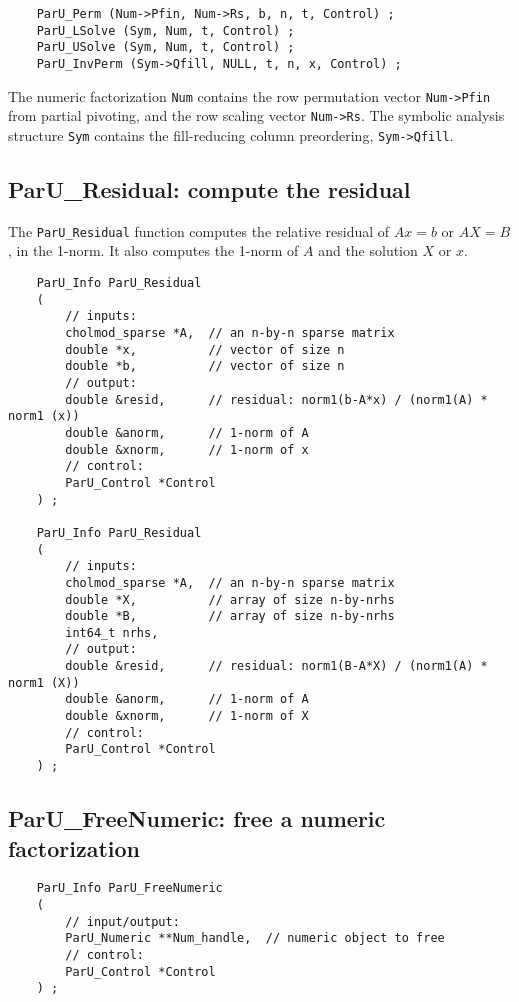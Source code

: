 \documentclass[12pt]{article}
\begin{document}
    {\footnotesize
    \begin{verbatim}
    ParU_Perm (Num->Pfin, Num->Rs, b, n, t, Control) ;
    ParU_LSolve (Sym, Num, t, Control) ;
    ParU_USolve (Sym, Num, t, Control) ;
    ParU_InvPerm (Sym->Qfill, NULL, t, n, x, Control) ; \end{verbatim} }

    The numeric factorization \verb'Num' contains the row permutation vector
    \verb'Num->Pfin' from partial pivoting, and the row scaling vector
    \verb'Num->Rs'.  The symbolic analysis structure \verb'Sym' contains the
    fill-reducing column preordering, \verb'Sym->Qfill'.

\subsection{{\sf ParU\_Residual}: compute the residual}

    The \verb'ParU_Residual' function computes the relative residual of
    $Ax=b$ or $AX=B$, in the 1-norm.  It also computes the 1-norm of $A$
    and the solution $X$ or $x$.

    {\footnotesize
    \begin{verbatim}
    ParU_Info ParU_Residual
    (
        // inputs:
        cholmod_sparse *A,  // an n-by-n sparse matrix
        double *x,          // vector of size n
        double *b,          // vector of size n
        // output:
        double &resid,      // residual: norm1(b-A*x) / (norm1(A) * norm1 (x))
        double &anorm,      // 1-norm of A
        double &xnorm,      // 1-norm of x
        // control:
        ParU_Control *Control
    ) ;

    ParU_Info ParU_Residual
    (
        // inputs:
        cholmod_sparse *A,  // an n-by-n sparse matrix
        double *X,          // array of size n-by-nrhs
        double *B,          // array of size n-by-nrhs
        int64_t nrhs,
        // output:
        double &resid,      // residual: norm1(B-A*X) / (norm1(A) * norm1 (X))
        double &anorm,      // 1-norm of A
        double &xnorm,      // 1-norm of X
        // control:
        ParU_Control *Control
    ) ; \end{verbatim} }

\subsection{{\sf ParU\_FreeNumeric}: free a numeric factorization}

    {\footnotesize
    \begin{verbatim}
    ParU_Info ParU_FreeNumeric
    (
        // input/output:
        ParU_Numeric **Num_handle,  // numeric object to free
        // control:
        ParU_Control *Control
    ) ; \end{verbatim} }
\end{document}
